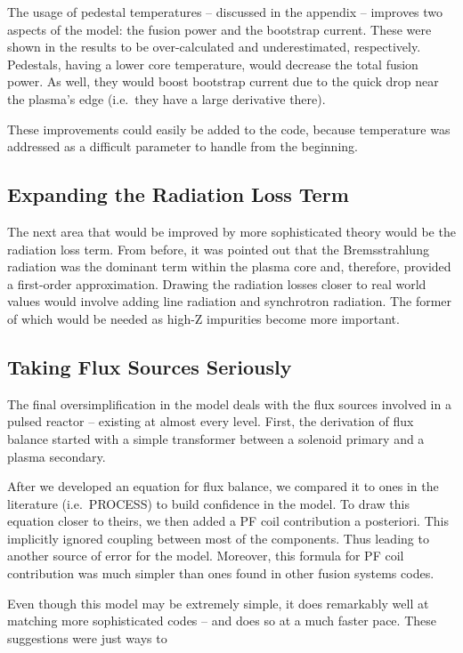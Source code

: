 The usage of pedestal temperatures -- discussed in the appendix -- improves two aspects of the model: the fusion power and the bootstrap current. These were shown in the results to be over-calculated and underestimated, respectively. Pedestals, having a lower core temperature, would decrease the total fusion power. As well, they would boost bootstrap current due to the quick drop near the plasma's edge (i.e.\ they have a large derivative there). 

These improvements could easily be added to the code, because temperature was addressed as a difficult parameter to handle from the beginning.

\subsection{Expanding the Radiation Loss Term}

The next area that would be improved by more sophisticated theory would be the radiation loss term. From before, it was pointed out that the Bremsstrahlung radiation was the dominant term within the plasma core and, therefore, provided a first-order approximation. Drawing the radiation losses closer to real world values would involve adding line radiation and synchrotron radiation. The former of which would be needed as high-Z impurities become more important.

\subsection{Taking Flux Sources Seriously}

The final oversimplification in the model deals with the flux sources involved in a pulsed reactor -- existing at almost every level. First, the derivation of flux balance started with a simple transformer between a solenoid primary and a plasma secondary. 

After we developed an equation for flux balance, we compared it to ones in the literature (i.e.\ PROCESS) to build confidence in the model. To draw this equation closer to theirs, we then added a PF coil contribution a posteriori. This implicitly ignored coupling between most of the components. Thus leading to another source of error for the model. Moreover, this formula for PF coil contribution was much simpler than ones found in other fusion systems codes.

Even though this model may be extremely simple, it does remarkably well at matching more sophisticated codes -- and does so at a much faster pace. These suggestions were  just ways to 

%
